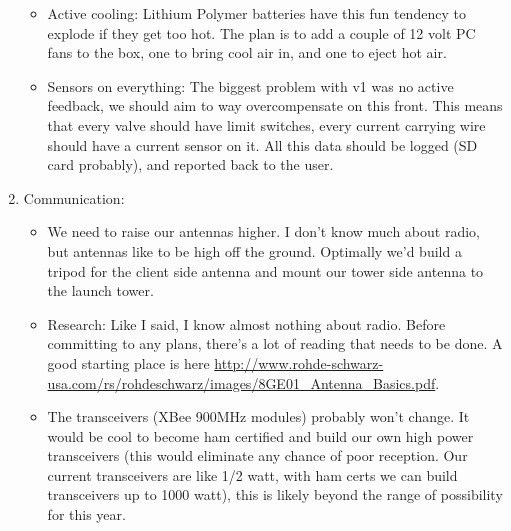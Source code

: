 \documentclass{article}
\begin{document}
\begin{enumerate}
\begin{itemize}
                \item Active cooling: Lithium Polymer batteries have this fun tendency to explode if they get too hot. The plan is to add a couple of 12 volt PC fans to the box, one to bring cool air in, and one to eject hot air.
                \item Sensors on everything: The biggest problem with v1 was no active feedback, we should aim to way overcompensate on this front. This means that every valve should have limit switches, every current carrying wire should have a current sensor on it. All this data should be logged (SD card probably), and reported back to the user.
            \end{itemize}
            \item Communication:
            \begin{itemize}
                \item We need to raise our antennas higher. I don't know much about radio, but antennas like to be high off the ground. Optimally we'd build a tripod for the client side antenna and mount our tower side antenna to the launch tower.
                \item Research: Like I said, I know almost nothing about radio. Before committing to any plans, there's a lot of reading that needs to be done. A good starting place is here \url{http://www.rohde-schwarz-usa.com/rs/rohdeschwarz/images/8GE01_Antenna_Basics.pdf}.
                \item The transceivers (XBee 900MHz modules) probably won't change. It would be cool to become ham certified and build our own high power transceivers (this would eliminate any chance of poor reception. Our current transceivers are like 1/2 watt, with ham certs we can build transceivers up to 1000 watt), this is likely beyond the range of possibility for this year.
            \end{itemize}
        \end{enumerate}
\end{document}
